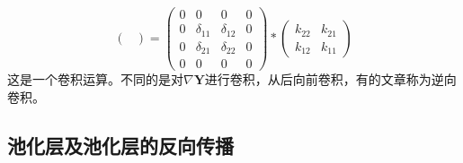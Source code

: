 \begin{enumerate}
\begin{equation}
\begin{pmatrix}
		\end{pmatrix} = \begin{pmatrix}
		0 & 0 & 0 & 0 \\ 
		0 & \delta_{11} & \delta_{12} & 0 \\ 
		0 & \delta_{21} & \delta_{22} & 0 \\ 
		0 & 0 & 0 & 0
		\end{pmatrix} *
		\begin{pmatrix}
		k_{22} & k_{21} \\ 
		k_{12} & k_{11}
		\end{pmatrix} 
	\end{equation}
	这是一个卷积运算。不同的是对$\nabla \boldsymbol{Y}$进行卷积，从后向前卷积，有的文章称为逆向卷积。
\end{enumerate}

\subsection{池化层及池化层的反向传播}